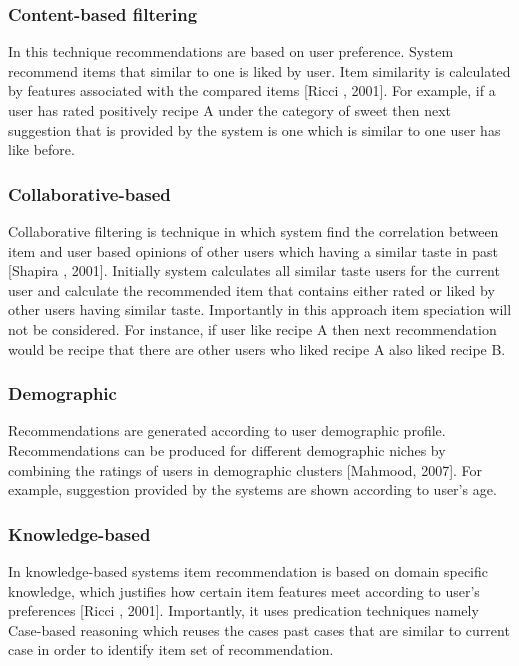 \subsubsection{Content-based filtering}

In this technique recommendations are based on user preference. System recommend items that similar to one is liked by user. Item similarity is calculated by features associated with the compared items [Ricci , 2001]. For example, if a user has rated positively recipe A under the category of sweet then next suggestion that is provided by the system is one which is similar to one user has like before.

\subsubsection{Collaborative-based}

Collaborative filtering is technique in which system find the correlation between item and user based opinions of other users which having a similar taste in past [Shapira , 2001]. Initially system calculates all similar taste users for the current user and calculate the recommended item that contains either rated or liked by other users having similar taste. Importantly in this approach item speciation will not be considered. For instance, if user like recipe A then next recommendation would be recipe that there are other users who liked recipe A also liked recipe B.

\subsubsection{Demographic}

Recommendations are generated according to user demographic profile. Recommendations can be produced for different demographic niches by combining the ratings of users in demographic clusters [Mahmood, 2007]. For example, suggestion provided by the systems are shown according to user’s age. 

\subsubsection{Knowledge-based}

In knowledge-based systems item recommendation is based on domain specific knowledge, which justifies how certain item features meet according to user’s preferences [Ricci , 2001]. Importantly, it uses predication techniques namely Case-based reasoning which reuses the cases past cases that are similar to current case in order to identify item set of recommendation.

